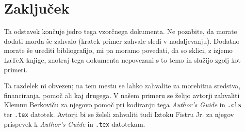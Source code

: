 \documentclass[article,slovene]{stucosrec}
\newcommand{\latex}{\LaTeX\xspace}
\begin{document}
	\section{Zaključek}
	
	Ta odstavek končuje jedro tega vzorčnega dokumenta.
	Ne pozabite, da morate dodati morda še zahvalo (kratek primer zahvale sledi v nadaljevanju).
	Dodatno morate še urediti bibliografijo, mi pa moramo povedati, da so sklici, z izjemo \latex knjige, znotraj tega dokumenta nepovezani s to temo in služijo zgolj kot primeri.
	
	\begin{acknowledgment}
		Ta razdelek ni obvezen; na tem mestu se lahko zahvalite za morebitna sredstva, financiranja, pomoč ali kaj drugega.
		V našem primeru se želijo avtorji zahvaliti Klemnu Berkoviču za njegovo pomoč pri kodiranju tega \textit{Author's Guide} in \texttt{.cls} ter \texttt{.tex} datotek.
		Avtorji bi se želeli zahvaliti tudi Iztoku Fistru Jr. za njegov prispevek k \textit{Author's Guide} in \texttt{.tex} datotekam.
	\end{acknowledgment}

	
	
\end{document}
